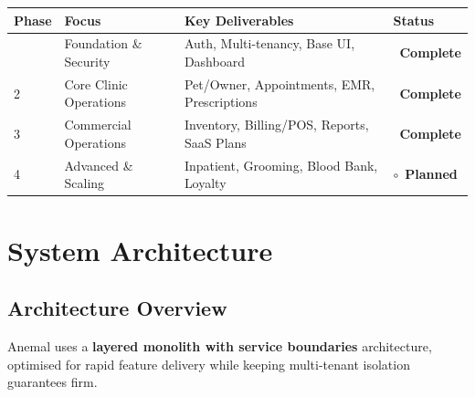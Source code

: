 \documentclass[12pt,a4paper]{report}
\newcommand{\complete}{\textcolor{successgreen}{\ding{51}~\textbf{Complete}}}
\newcommand{\planned}{\textcolor{warnorange}{$\circ$~\textbf{Planned}}}
\begin{document}
\begin{longtable}{C{1.5cm} L{4cm} L{6cm} C{2.5cm}}
\toprule
\textbf{Phase} & \textbf{Focus} & \textbf{Key Deliverables} & \textbf{Status} \\\midrule\endhead\bottomrule{} & Foundation \& Security  & Auth, Multi-tenancy, Base UI, Dashboard  & \complete \\
2 & Core Clinic Operations  & Pet/Owner, Appointments, EMR, Prescriptions & \complete \\
3 & Commercial Operations   & Inventory, Billing/POS, Reports, SaaS Plans & \complete \\
4 & Advanced \& Scaling     & Inpatient, Grooming, Blood Bank, Loyalty  & \planned \\
\end{longtable}

\chapter{System Architecture}

\section{Architecture Overview}

Anemal uses a \textbf{layered monolith with service boundaries} architecture, optimised for rapid feature delivery while keeping multi-tenant isolation guarantees firm.
\end{document}
